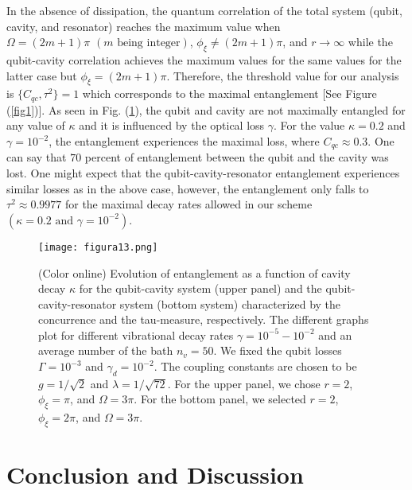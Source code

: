 In the absence of dissipation, the quantum correlation of the total system (qubit, cavity, and resonator) reaches the maximum value when $\Omega = (2m+1)\pi \,\, (m \,\,\text{being integer})$, $\phi_{\xi} \neq (2m+1)\pi$, and $r \rightarrow \infty$  while the qubit-cavity correlation achieves the maximum values for the same values for the latter case  but $\phi_{\xi} = (2m+1)\pi$. Therefore, the threshold value for our analysis is $\{C_{qc}, \tau^{2}\}=1$ which corresponds to the maximal entanglement [See Figure (\ref{fig1})]. As seen in Fig. (\ref{figdme}), the qubit and cavity are not maximally entangled for any value of $\kappa$ and it is influenced by the optical loss $\gamma$. For the value $\kappa = 0.2$ and $\gamma = 10^{-2}$, the entanglement experiences the maximal loss, where $C_{qc} \approx 0.3$. One can say that $70$ percent of entanglement between the qubit and the cavity was lost. One might expect that the qubit-cavity-resonator entanglement experiences similar losses as in the above case, however, the entanglement only falls to  $\tau^{2} \approx 0.9977$ for the maximal decay rates allowed in our scheme $(\kappa=0.2\,\, \text{and}\,\,\gamma=10^{-2})$. 

\begin{figure}
	\centering
	\texttt{[image: figura13.png]}
	\caption{(Color online) Evolution of entanglement as a function of cavity decay $\kappa$ for the qubit-cavity system (upper panel) and the qubit-cavity-resonator system (bottom system) characterized by the concurrence and the tau-measure, respectively. The different graphs plot for different vibrational decay rates $\gamma = 10^{-5}-10^{-2}$ and an average number of the bath $n_{v}=50$. We fixed the qubit losses $\Gamma = 10^{-3}$ and $\gamma_{d} = 10^{-2}$. The coupling constants are chosen to be $g=1/\sqrt{2}$ and $\lambda=1/\sqrt{72}$. For the upper panel, we chose $r=2$, $\phi_{\xi}=\pi$, and $\Omega=3\pi$. For the bottom panel, we selected $r=2$, $\phi_{\xi}=2\pi$, and $\Omega=3\pi$.}
	\label{figdme}
\end{figure}

\section{\label{sec:conclusion}Conclusion and Discussion}

